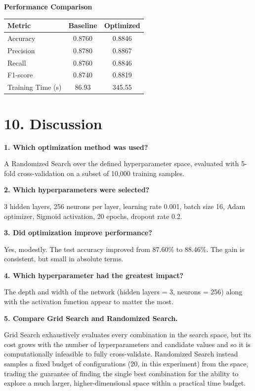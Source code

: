 \documentclass[11pt]{article}
\begin{document}
\textbf{Performance Comparison}

\begin{tabular}{|p{4cm}|c|c|}
\hline
Metric & Baseline & Optimized\\
\hline
Accuracy & 0.8760 & 0.8846\\
Precision & 0.8780 & 0.8867\\
Recall & 0.8760 & 0.8846\\
F1-score & 0.8740 & 0.8819\\
Training Time (s) & 86.93 & 345.55\\
\hline
\end{tabular}


\section*{10. Discussion}

\textbf{1. Which optimization method was used?}

A Randomized Search over the defined hyperparameter space, evaluated with 5-fold cross-validation on a subset of 10,000 training samples. 

\textbf{2. Which hyperparameters were selected?}

3 hidden layers, 256 neurons per layer, learning rate 0.001, batch size 16, Adam optimizer, Sigmoid activation, 20 epochs, dropout rate 0.2.

\textbf{3. Did optimization improve performance?}

Yes, modestly. The test accuracy improved from 87.60\% to 88.46\%. The gain is consistent, but small in absolute terms.

\textbf{4. Which hyperparameter had the greatest impact?}

The depth and width of the network (hidden layers = 3, neurons = 256) along with the activation function appear to matter the most.

\textbf{5. Compare Grid Search and Randomized Search.}

Grid Search exhaustively evaluates every combination in the search space, but its cost grows with the number of hyperparameters and candidate values and so it is computationally infeasible to fully cross-validate. Randomized Search instead samples a fixed budget of configurations (20, in this experiment) from the space, trading the guarantee of finding the single best combination for the ability to explore a much larger, higher-dimensional space within a practical time budget. 
\end{document}
